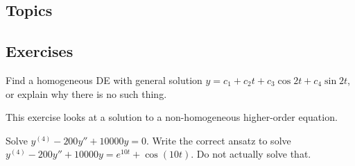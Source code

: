 \reviewSection

\subsection{Topics}

\subsection{Exercises}

\begin{exercise}
Find a homogeneous DE with general solution
$y=c_1+c_2t+c_3\cos 2t+ c_4\sin 2t$, or explain why there is no such thing.
\end{exercise}

\begin{exercise}
This exercise looks at a solution to a non-homogeneous higher-order equation.
\begin{tasks}
\task Solve $y^{(4)}-200y''+10000y=0$.
\task Write the correct ansatz to solve $y^{(4)}-200y''+10000y=e^{10t}+ \cos(10t)$. Do not actually solve that.
\end{tasks}
\end{exercise}